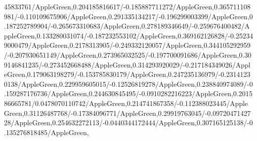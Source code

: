 {\begin{tikzternal}
{45833761/AppleGreen,0.204185816617/-0.185887711272/AppleGreen,0.365711108981/-0.110109675906/AppleGreen,0.291335134217/-0.196299003399/AppleGreen,0.187252789904/-0.265673310683/AppleGreen,0.278189346649/-0.259676400482/AppleGreen,0.133280031074/-0.187232553102/AppleGreen,0.369162126828/-0.252349000479/AppleGreen,0.2178313905/-0.249332120057/AppleGreen,0.344105292959/-0.207930651149/AppleGreen,0.273965032525/-0.197700091686/AppleGreen,0.309146841235/-0.273452668488/AppleGreen,0.314293920029/-0.217184349026/AppleGreen,0.179063198279/-0.153785830179/AppleGreen,0.247235136979/-0.23141230138/AppleGreen,0.229959605015/-0.12526819278/AppleGreen,0.238840974089/-0.159287176736/AppleGreen,0.244630845495/-0.0910282216223/AppleGreen,0.201586665781/0.0478070110742/AppleGreen,0.214741867358/-0.112388023445/AppleGreen,0.31126487768/-0.17384096771/AppleGreen,0.29919763045/-0.0972047142728/AppleGreen,0.254632272113/-0.0440344172444/AppleGreen,0.307165125138/-0.135276818485/AppleGreen,
}
\end{tikzternal}}
